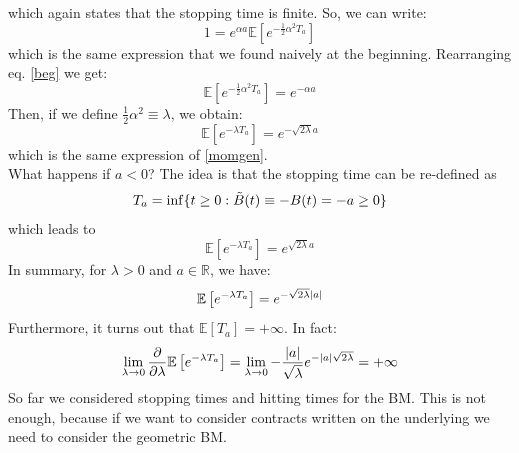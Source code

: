 which again states that the stopping time is finite. So, we can write:
\begin{equation}\label{beg}
    1 = e^{\alpha a}\mathbb{E}\left[e^{-\frac{1}{2}\alpha^2 T_a}\right]
\end{equation}
which is the same expression that we found naively at the beginning. Rearranging eq. \eqref{beg} we get:
\begin{equation}
    \mathbb{E}\left[e^{-\frac{1}{2}\alpha^2 T_a}\right] = e^{-\alpha a}
\end{equation}
Then, if we define $\frac{1}{2}\alpha^2 \equiv \lambda$, we obtain:
\begin{equation}
    \mathbb{E}\left[e^{-\lambda T_a}\right] = e^{-\sqrt{2\lambda} a}
\end{equation}
which is the same expression of \eqref{momgen}.\\
What happens if $a<0$? The idea is that the stopping time can be re-defined as
\begin{equation}
    T_a = \inf\{t\ge0: \Tilde{B}(t) \equiv -B(t) = -a \ge 0\}
\end{equation}
which leads to
\begin{equation}
    \mathbb{E}\left[e^{-\lambda T_a}\right] = e^{\sqrt{2\lambda} a}
\end{equation}
In summary, for $\lambda > 0$ and $a\in\mathbb{R}$, we have:
\begin{equation}
    \mathbb{E}\left[e^{-\lambda T_a}\right] = e^{-\sqrt{2\lambda} \abs{a}}
\end{equation}
Furthermore, it turns out that $\mathbb{E}[T_a]=+\infty$. In fact:
\begin{equation}
    \lim_{\lambda\to0}\pdv{}{\lambda}\mathbb{E}\left[e^{-\lambda T_a}\right] = \lim_{\lambda\to0}-\frac{\abs{a}}{\sqrt{\lambda}}e^{-\abs{a}\sqrt{2\lambda}} = +\infty
\end{equation}
So far we considered stopping times and hitting times for the BM. This is not enough, because if we want to consider contracts written on the underlying we need to consider the geometric BM.
